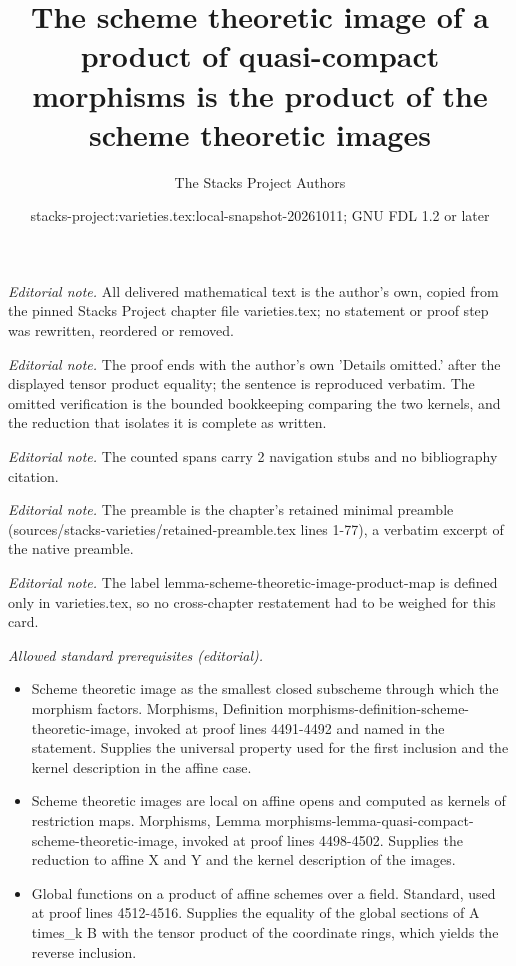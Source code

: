 \documentclass[10pt,a4paper]{amsart}
\title{The scheme theoretic image of a product of quasi-compact morphisms is the product of the scheme theoretic images}
\author{The Stacks Project Authors}
\date{stacks-project:varieties.tex:local-snapshot-20261011; GNU FDL 1.2 or later}
\theoremstyle{plain}
\theoremstyle{definition}
\theoremstyle{remark}
\numberwithin{equation}{subsection}
\begin{document}
\maketitle
\noindent\textit{Editorial note.} All delivered mathematical text is the author's own, copied from the pinned Stacks Project chapter file varieties.tex; no statement or proof step was rewritten, reordered or removed.\par\medskip
\noindent\textit{Editorial note.} The proof ends with the author's own 'Details omitted.' after the displayed tensor product equality; the sentence is reproduced verbatim. The omitted verification is the bounded bookkeeping comparing the two kernels, and the reduction that isolates it is complete as written.\par\medskip
\noindent\textit{Editorial note.} The counted spans carry 2 navigation stubs and no bibliography citation.\par\medskip
\noindent\textit{Editorial note.} The preamble is the chapter's retained minimal preamble (sources/stacks-varieties/retained-preamble.tex lines 1-77), a verbatim excerpt of the native preamble.\par\medskip
\noindent\textit{Editorial note.} The label lemma-scheme-theoretic-image-product-map is defined only in varieties.tex, so no cross-chapter restatement had to be weighed for this card.\par\medskip
\noindent\textit{Allowed standard prerequisites (editorial).}\begin{itemize}
\item Scheme theoretic image as the smallest closed subscheme through which the morphism factors. Morphisms, Definition morphisms-definition-scheme-theoretic-image, invoked at proof lines 4491-4492 and named in the statement. Supplies the universal property used for the first inclusion and the kernel description in the affine case.
\item Scheme theoretic images are local on affine opens and computed as kernels of restriction maps. Morphisms, Lemma morphisms-lemma-quasi-compact-scheme-theoretic-image, invoked at proof lines 4498-4502. Supplies the reduction to affine X and Y and the kernel description of the images.
\item Global functions on a product of affine schemes over a field. Standard, used at proof lines 4512-4516. Supplies the equality of the global sections of A times\_k B with the tensor product of the coordinate rings, which yields the reverse inclusion.
\end{itemize}\medskip
\end{document}

